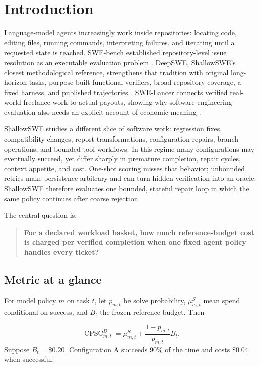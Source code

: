 \documentclass[11pt]{article}
\begin{document}
\section{Introduction}\hypertarget{1-introduction}{}\label{1-introduction}

Language-model agents increasingly work inside repositories: locating code, editing files, running commands, interpreting failures, and iterating until a requested state is reached. SWE-bench established repository-level issue resolution as an executable evaluation problem \citep{jimenez2024swebench}. DeepSWE, ShallowSWE's closest methodological reference, strengthens that tradition with original long-horizon tasks, purpose-built functional verifiers, broad repository coverage, a fixed harness, and published trajectories \citep{huang2026deepswe}. SWE-Lancer connects verified real-world freelance work to actual payouts, showing why software-engineering evaluation also needs an explicit account of economic meaning \citep{miserendino2025swelancer}.

ShallowSWE studies a different slice of software work: regression fixes, compatibility changes, report transformations, configuration repairs, branch operations, and bounded tool workflows. In this regime many configurations may eventually succeed, yet differ sharply in premature completion, repair cycles, context appetite, and cost. One-shot scoring misses that behavior; unbounded retries make persistence arbitrary and can turn hidden verification into an oracle. ShallowSWE therefore evaluates one bounded, stateful repair loop in which the same policy continues after coarse rejection.

The central question is:

\begin{quote}
\textbf{For a declared workload basket, how much reference-budget cost is charged per verified completion when one fixed agent policy handles every ticket?}
\end{quote}

\subsection{Metric at a glance}\hypertarget{11-metric-at-a-glance}{}\label{11-metric-at-a-glance}

For model policy $m$ on task $t$, let $p_{m,t}$ be solve probability, $\mu^S_{m,t}$ mean spend conditional on success, and $B_t$ the frozen reference budget. Then

\[
\operatorname{CPSC}^{B}_{m,t}
=\mu^S_{m,t}+\frac{1-p_{m,t}}{p_{m,t}}B_t.
\]
Suppose $B_t=\$0.20$. Configuration A succeeds 90\% of the time and costs $\$0.04$ when successful:
\end{document}
